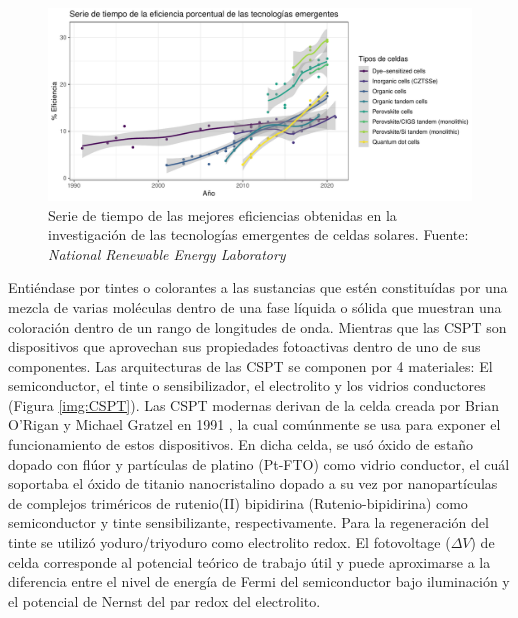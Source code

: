 \begin{figure}[h!]
    \begin{center}
        \includegraphics[scale=0.6]{img/emergentes.pdf}
    \end{center}
    \caption{Serie de tiempo de las mejores eficiencias obtenidas en la investigación de las tecnologías emergentes de celdas solares.
    Fuente: \textit{National Renewable Energy Laboratory} \cite{nrel}}
    \label{img:SerieEmergente}
\end{figure}

Entiéndase por tintes o colorantes a las sustancias que estén constituídas por una mezcla de varias moléculas dentro de una fase líquida o sólida que muestran una coloración dentro de un rango de longitudes de onda. Mientras que las CSPT son dispositivos que aprovechan sus propiedades fotoactivas dentro de uno de sus componentes. Las arquitecturas de las CSPT se componen por 4 materiales: El semiconductor, el tinte o sensibilizador, el electrolito y los vidrios conductores (Figura \ref{img:CSPT}). Las CSPT modernas derivan de la celda creada por Brian O'Rigan y Michael Gratzel en 1991 \cite{o1991low}, la cual comúnmente se usa para exponer el funcionamiento de estos dispositivos. En dicha celda, se usó óxido de estaño dopado con flúor y partículas de platino (Pt-FTO) como vidrio conductor, el cuál soportaba el óxido de titanio  nanocristalino dopado a su vez por nanopartículas de complejos triméricos de rutenio(II) bipidirina (Rutenio-bipidirina) como semiconductor y tinte sensibilizante, respectivamente. Para la regeneración del tinte se utilizó yoduro/triyoduro como electrolito redox. El fotovoltage ($\Delta V$) de celda corresponde al potencial teórico de trabajo útil y puede aproximarse a la diferencia entre el nivel de energía de Fermi del semiconductor bajo iluminación y el potencial de Nernst del par redox del electrolito.

